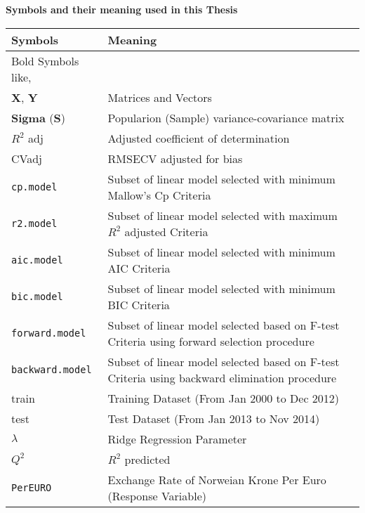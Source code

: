 \documentclass[12pt, lot, lof]{thesis}\usepackage[]{graphicx}\usepackage[]{color}
\newcommand{\bs}[1]{\ensuremath{\boldsymbol{#1}}}
\newcommand{\mbf}[1]{\ensuremath{\mathbf{#1}}}
\begin{document}
\pagebreak
\begin{center}\textbf{Symbols and their meaning used in this Thesis}\end{center}
\begin{tabularx}{\textwidth}{lX}
  \toprule
Symbols & Meaning \\ 
  \hline \endhead  \midrule
Bold Symbols like, \\
\mbf{X}, \mbf{Y} & Matrices and Vectors \\ 
  \bs{Sigma} (\mbf{S}) & Popularion (Sample) variance-covariance matrix \\ 
  $R^2$ adj & Adjusted coefficient of determination \\ 
  CVadj & RMSECV adjusted for bias \\ 
  \texttt{cp.model} & Subset of linear model selected with minimum Mallow's Cp Criteria \\ 
  \texttt{r2.model} & Subset of linear model selected with maximum $R^2$ adjusted Criteria \\ 
  \texttt{aic.model} & Subset of linear model selected with minimum AIC Criteria \\ 
  \texttt{bic.model} & Subset of linear model selected with minimum BIC Criteria \\ 
  \texttt{forward.model} & Subset of linear model selected based on F-test Criteria using forward selection procedure \\ 
  \texttt{backward.model} & Subset of linear model selected based on F-test Criteria using backward elimination procedure \\ 
  train & Training Dataset (From Jan 2000 to Dec 2012) \\ 
  test & Test Dataset (From Jan 2013 to Nov 2014) \\ 
  $\lambda$ & Ridge Regression Parameter \\ 
  $Q^2$ & $R^2$ predicted \\ 
  \texttt{PerEURO} & Exchange Rate of Norweian Krone Per Euro (Response Variable) \\ 
   \bottomrule
\end{tabularx}


\clearpage{}


\end{document}
